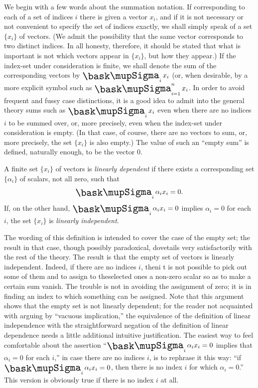 We begin with a few words about the summation notation. If corresponding to each
of a set of indices \(i\) there is given a vector \(x_i\), and if it is not
necessary or not convenient to specify the set of indices exactly, we shall
simply speak of a set \(\{x_i\}\) of vectors. (We admit the possibility that the
same vector corresponds to two distinct indices. In all honesty, therefore, it
should be stated that what is important is not which vectors appear in
\(\{x_i\}\), but how they appear.) If the index-set under consideration is
finite, we shall denote the sum of the corresponding vectors by \(\sumx_i x_i\)
(or, when desirable, by a more explicit symbol such as \(\sumx_{i=1}^n x_i\). In
order to avoid frequent and fussy case distinctions, it is a good idea to admit
into the general theory sums such as \(\sumx_i x_i\) even when there are no
indices \(i\) to be summed over, or, more precisely, even when the index-set
under consideration is empty. (In that case, of course, there are no vectors to
sum, or, more precisely, the set \(\{x_i\}\) is also empty.) The value of such
an ``empty sum'' is defined, naturally enough, to be the vector 0.

\begin{definition}
    A finite set \(\{x_i\}\) of vectors is \emph{linearly dependent} if there
    exists a corresponding set \(\{\alpha_i\}\) of scalars, not all zero, such
    that
    \begin{equation*}
        \textstyle\sumx_i \alpha_i x_i = 0.
    \end{equation*}
    If, on the other hand, \(\sumx_i \alpha_i x_i = 0\) implies \(\alpha_i = 0\)
    for each \(i\), the set \(\{x_i\}\) is \emph{linearly independent}.
\end{definition}

The wording of this definition is intended to cover the case of the empty set;
the result in that case, though possibly paradoxical, dovetails very
satisfactorily with the rest of the theory. The result is that the empty set of
vectors is linearly independent. Indeed, if there are no indices \(i\), theni t
is not possible to pick out some of them and to assign to theselected ones a
non-zero scalar so as to make a certain sum vanish. The trouble is not in
avoiding the assignment of zero; it is in finding an index to which something
can be assigned. Note that this argument shows that the empty set is not
linearly dependent; for the reader not acquainted with arguing by ``vacuous
implication,'' the equivalence of the definition of linear independence with the
straightforward negation of the definition of linear dependence needs a little
additional intuitive justification. The easiest way to feel comfortable about
the assertion ``\(\sumx_i \alpha_i x_i = 0\) implies that \(\alpha_i = 0\) for
each \(i\),'' in case there are no indices \(i\), is to rephrase it this way:
``if \(\sumx_i \alpha_i x_i = 0\), then there is no index \(i\) for which
\(\alpha_i = 0\).'' This version is obviously true if there is no index \(i\) at
all.

